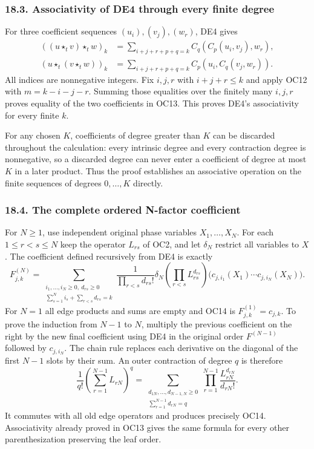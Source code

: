 \documentclass[
  11pt,
]{article}
\begin{document}
\subsubsection{18.3. Associativity of DE4 through every finite
degree}\label{associativity-of-de4-through-every-finite-degree}

For three coefficient sequences \((u_i),(v_j),(w_r)\), DE4 gives \[
\begin{aligned}
((u\star_t v)\star_t w)_k
&=\sum_{i+j+r+p+q=k}C_q(C_p(u_i,v_j),w_r),\\
(u\star_t(v\star_t w))_k
&=\sum_{i+j+r+p+q=k}C_p(u_i,C_q(v_j,w_r)).
\end{aligned}
\tag{OC13}
\] All indices are nonnegative integers. Fix \(i,j,r\) with
\(i+j+r\le k\) and apply OC12 with \(m=k-i-j-r\). Summing those
equalities over the finitely many \(i,j,r\) proves equality of the two
coefficients in OC13. This proves DE4's associativity for every finite
\(k\).

For any chosen \(K\), coefficients of degree greater than \(K\) can be
discarded throughout the calculation: every intrinsic degree and every
contraction degree is nonnegative, so a discarded degree can never enter
a coefficient of degree at most \(K\) in a later product. Thus the proof
establishes an associative operation on the finite sequences of degrees
\(0,\ldots,K\) directly.

\subsubsection{18.4. The complete ordered N-factor
coefficient}\label{the-complete-ordered-n-factor-coefficient}

For \(N\ge1\), use independent original phase variables
\(X_1,\ldots,X_N\). For each \(1\le r<s\le N\) keep the operator
\(L_{rs}\) of OC2, and let \(\delta_N\) restrict all variables to \(X\).
The coefficient defined recursively from DE4 is exactly \[
F_{j,k}^{(N)}
=\sum_{\substack{i_1,\ldots,i_N\ge0,\ d_{rs}\ge0\\
       \sum_{s=1}^Ni_s+\sum_{r<s}d_{rs}=k}}
 \frac1{\prod_{r<s}d_{rs}!}
 \delta_N\left(\prod_{r<s}L_{rs}^{d_{rs}}\right)
 \bigl(c_{j,i_1}(X_1)\cdots c_{j,i_N}(X_N)\bigr).
\tag{OC14}
\] For \(N=1\) all edge products and sums are empty and OC14 is
\(F_{j,k}^{(1)}=c_{j,k}\). To prove the induction from \(N-1\) to \(N\),
multiply the previous coefficient on the right by the new final
coefficient using DE4 in the original order \(F^{(N-1)}\) followed by
\(c_{j,i_N}\). The chain rule replaces each derivative on the diagonal
of the first \(N-1\) slots by their sum. An outer contraction of degree
\(q\) is therefore \[
\frac1{q!}\left(\sum_{r=1}^{N-1}L_{rN}\right)^q
=\sum_{\substack{d_{1N},\ldots,d_{N-1,N}\ge0\\
                 \sum_{r=1}^{N-1}d_{rN}=q}}
 \prod_{r=1}^{N-1}\frac{L_{rN}^{d_{rN}}}{d_{rN}!}.
\tag{OC15}
\] It commutes with all old edge operators and produces precisely OC14.
Associativity already proved in OC13 gives the same formula for every
other parenthesization preserving the leaf order.
\end{document}
